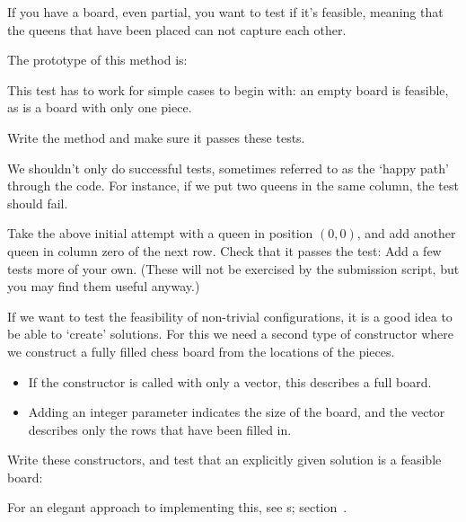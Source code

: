 If you have a board,
even partial,
you want to test if it's feasible,
meaning that the queens that have been placed can not capture each other.

The prototype of this method is:

This test has to work for simple cases to begin with:
an empty board is feasible, as is a board with only one piece.

\begin{exercise}
  Write the method and make sure it passes these tests.
\end{exercise}

We shouldn't only do successful tests,
sometimes referred to as the `happy path' through the code.
For instance,
if we put two queens in the same column, the test should fail.

\begin{exercise}
  Take the above initial attempt with a queen in position $(0,0)$,
  and add another queen in column zero of the next row.
  Check that it passes the test:
  Add a few tests more of your own.
  (These will not be exercised by the submission script,
  but you may find them useful anyway.)
\end{exercise}


If we want to test the feasibility of non-trivial configurations,
it is a good idea to be able to `create' solutions.
For this we need a second type of constructor
where we construct a fully filled chess board
from the locations of the pieces.
%
\begin{itemize}
\item If the constructor is called with only a vector, this describes a full board.
\item Adding an integer parameter indicates the size of the board,
  and the vector describes only the rows that have been filled in.
\end{itemize}

\begin{exercise}
  Write these constructors, and
  test that an explicitly given solution is a feasible board:
\end{exercise}

For an elegant approach to implementing this,
see s;
section~.

